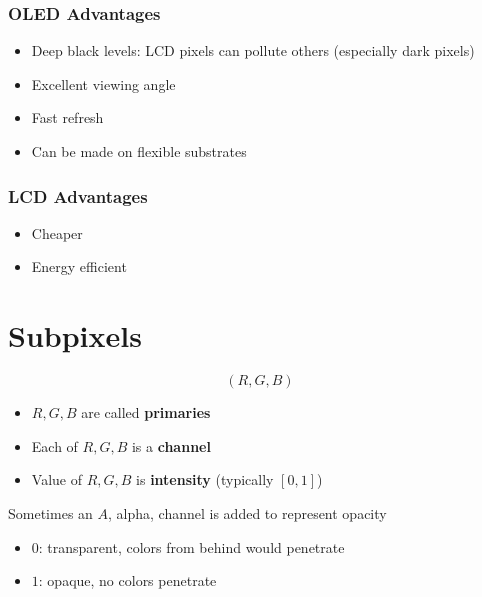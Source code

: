    \subsubsection{OLED Advantages}

      \begin{itemize}
        \item Deep black levels: LCD pixels can pollute others
        (especially dark pixels)
        \item Excellent viewing angle
        \item Fast refresh
        \item Can be made on flexible substrates
      \end{itemize}

    \subsubsection{LCD Advantages}

      \begin{itemize}
        \item Cheaper
        \item Energy efficient
      \end{itemize}

\section{Subpixels}

  \begin{equation*}
    \left( R, G, B \right)
  \end{equation*}

  \begin{itemize}
    \item $ R, G, B $ are called \textbf{primaries}
    \item Each of $ R, G, B $ is a \textbf{channel}
    \item Value of $ R, G, B $ is \textbf{intensity}
    (typically $ \left[0, 1 \right] $)
  \end{itemize}

  Sometimes an $ A $, alpha, channel is added to represent opacity

  \begin{itemize}
    \item $ 0 $: transparent, colors from behind would penetrate
    \item $ 1 $: opaque, no colors penetrate
  \end{itemize}

